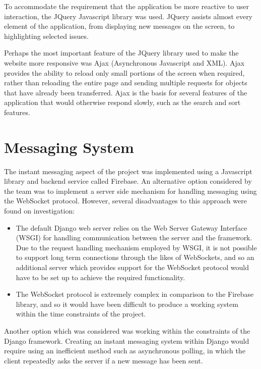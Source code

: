 \documentclass[a4paper]{l3proj}
\begin{document}
To accommodate the requirement that the application be more reactive to user interaction, the JQuery Javascript library was used. JQuery assists almost every element of the application, from displaying new messages on the screen, to highlighting selected issues. 

Perhaps the most important feature of the JQuery library used to make the website more responsive was Ajax (Asynchronous Javascript and XML). Ajax provides the ability to reload only small portions of the screen when required, rather than reloading the entire page and sending multiple requests for objects that have already been transferred. Ajax is the basis for several features of the application that would otherwise respond slowly, such as the search and sort features.
\section{Messaging System}
\label{messagingSystem}

The instant messaging aspect of the project was implemented using a Javascript library and backend service called Firebase. An alternative option considered by the team was to implement a server side mechanism for handling messaging using the WebSocket protocol. However, several disadvantages to this approach were found on investigation:

\begin{itemize}
\item The default Django web server relies on the Web Server Gateway Interface (WSGI) for handling communication between the server and the framework. Due to the request handling mechanism employed by WSGI, it is not possible to support long term connections through the likes of WebSockets, and so an additional server which provides support for the WebSocket protocol would have to be set up to achieve the required functionality.
\item The WebSocket protocol is extremely complex in comparison to the Firebase library, and so it would have been difficult to produce a working system within the time constraints of the project.
\end{itemize}

Another option which was considered was working within the constraints of the Django framework. Creating an instant messaging system within Django would require using an inefficient method such as asynchronous polling, in which the client repeatedly asks the server if a new message has been sent.
\end{document}
